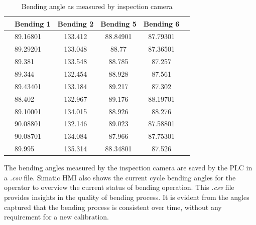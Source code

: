 \begin{table}[ht]
    \centering
    \small
    \renewcommand{\arraystretch}{1.2} %
    \begin{tabular}{llcccc}
        & \textbf{Bending 1} & \textbf{Bending 2} & \textbf{Bending 5} & \textbf{Bending 6} \\
        \hline
        & 89.16801 & 133.412 & 88.84901 & 87.79301 \\
        & 89.29201 & 133.048 & 88.77    & 87.36501 \\
        & 89.381   & 133.548 & 88.785   & 87.257   \\
        & 89.344   & 132.454 & 88.928   & 87.561   \\
        & 89.43401 & 133.184 & 89.217   & 87.302   \\
        & 88.402   & 132.967 & 89.176   & 88.19701 \\
        & 89.10001 & 134.015 & 88.926   & 88.276   \\
        & 90.08801 & 132.146 & 89.023   & 87.58801 \\
        & 90.08701 & 134.084 & 87.966   & 87.75301 \\
        & 89.995   & 135.314 & 88.34801 & 87.526   \\
        \hline
    \end{tabular}
    \caption{Bending angle as measured by inspection camera}
    \label{tab:bending-data}
\end{table}

The bending angles measured by the inspection camera are saved by the PLC in a \textit{.csv} file. Simatic HMI also shows the current cycle bending angles for the operator to overview the current status of bending operation. This \textit{.csv} file provides insights in the quality of bending process. It is evident from the angles captured that the bending process is consistent over time, without any requirement for a new calibration.